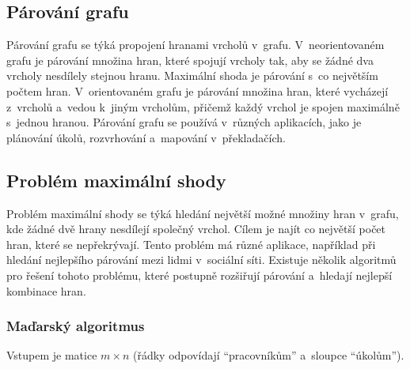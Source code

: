 % 

\subsection{Párování grafu}

Párování grafu se týká propojení hranami vrcholů v~grafu. V~neorientovaném grafu je párování množina hran, které spojují vrcholy tak, aby se žádné dva vrcholy nesdílely stejnou hranu. Maximální shoda je párování s~co největším počtem hran. V~orientovaném grafu je párování množina hran, které vycházejí z~vrcholů a~vedou k~jiným vrcholům, přičemž každý vrchol je spojen maximálně s~jednou hranou. Párování grafu se používá v~různých aplikacích, jako je plánování úkolů, rozvrhování a~mapování v~překladačích.

% 

\subsection{Problém maximální shody}

Problém maximální shody se týká hledání největší možné množiny hran v~grafu, kde žádné dvě hrany nesdílejí společný vrchol. Cílem je najít co největší počet hran, které se nepřekrývají. Tento problém má různé aplikace, například při hledání nejlepšího párování mezi lidmi v~sociální síti. Existuje několik algoritmů pro řešení tohoto problému, které postupně rozšiřují párování a~hledají nejlepší kombinace hran.

\subsubsection{Maďarský algoritmus}

Vstupem je matice $m \times n$ (řádky odpovídají \enquote{pracovníkům} a~sloupce \enquote{úkolům}).

